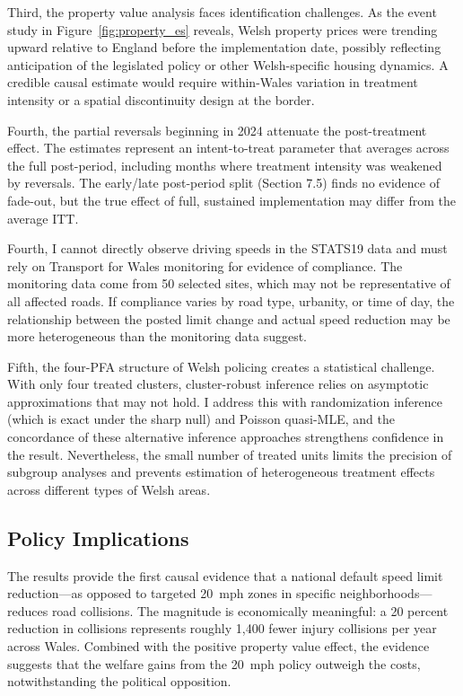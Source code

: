 \documentclass[12pt]{article}
\begin{document}
Third, the property value analysis faces identification challenges. As the event study in Figure~\ref{fig:property_es} reveals, Welsh property prices were trending upward relative to England before the implementation date, possibly reflecting anticipation of the legislated policy or other Welsh-specific housing dynamics. A credible causal estimate would require within-Wales variation in treatment intensity or a spatial discontinuity design at the border.

Fourth, the partial reversals beginning in 2024 attenuate the post-treatment effect. The estimates represent an intent-to-treat parameter that averages across the full post-period, including months where treatment intensity was weakened by reversals. The early/late post-period split (Section 7.5) finds no evidence of fade-out, but the true effect of full, sustained implementation may differ from the average ITT.

Fourth, I cannot directly observe driving speeds in the STATS19 data and must rely on Transport for Wales monitoring for evidence of compliance. The monitoring data come from 50 selected sites, which may not be representative of all affected roads. If compliance varies by road type, urbanity, or time of day, the relationship between the posted limit change and actual speed reduction may be more heterogeneous than the monitoring data suggest.

Fifth, the four-PFA structure of Welsh policing creates a statistical challenge. With only four treated clusters, cluster-robust inference relies on asymptotic approximations that may not hold. I address this with randomization inference (which is exact under the sharp null) and Poisson quasi-MLE, and the concordance of these alternative inference approaches strengthens confidence in the result. Nevertheless, the small number of treated units limits the precision of subgroup analyses and prevents estimation of heterogeneous treatment effects across different types of Welsh areas.

\subsection{Policy Implications}

The results provide the first causal evidence that a national default speed limit reduction---as opposed to targeted 20~mph zones in specific neighborhoods---reduces road collisions. The magnitude is economically meaningful: a 20 percent reduction in collisions represents roughly 1,400 fewer injury collisions per year across Wales. Combined with the positive property value effect, the evidence suggests that the welfare gains from the 20~mph policy outweigh the costs, notwithstanding the political opposition.
\end{document}
